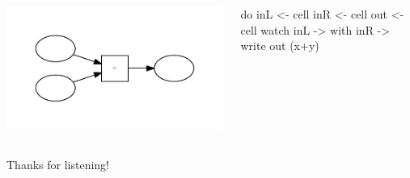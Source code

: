 \documentclass[UKenglish,usenames,dvipsnames,svgnames,table,aspectratio=169,mathserif]{beamer}
\begin{document}
\begin{frame}[fragile]
\begin{columns}
\begin{column}{0.5\textwidth}
\includegraphics{prop2.pdf}
\end{column}
\begin{column}{0.5\textwidth}
\begin{haskellcode}
do
  inL <- cell
  inR <- cell
  out <- cell
  watch inL \x ->
    with inR \y ->
    write out (x+y)
\end{haskellcode}
\end{column}
\end{columns}
\end{frame}


\begin{frame}
\Huge

\end{frame}



\fi

\begin{frame}
\huge \centering
Thanks for listening!
\end{frame}
\end{document}
